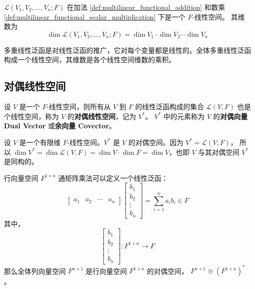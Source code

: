 \begin{proposition}[全体多重线性泛函构成一个线性空间]
    $\mathcal{L}(V_1,V_2,\ldots,V_n;F)$ 在加法 \ref{def:multilinear_functional_addition} 和数乘 \ref{def:multilinear_functional_scalar_multiplication} 下是一个 $F$-线性空间。
    其维数为
    \[
        \dim \mathcal{L}(V_1,V_2,\ldots,V_n;F) = \dim V_1 \cdot \dim V_2 \cdots \dim V_n
    \]
\end{proposition}

\begin{note}
    多重线性泛函是对线性泛函的推广，它对每个变量都是线性的。全体多重线性泛函构成一个线性空间，其维数是各个线性空间维数的乘积。
\end{note}


\vspace{1em}
\subsection{对偶线性空间}

\begin{definition}
    设 $V$ 是一个 $F$-线性空间，则所有从 $V$ 到 $F$ 的线性泛函构成的集合 $\mathcal{L}(V,F)$ 也是个线性空间，称为 $V$ 的\textbf{对偶线性空间}，记为 $V^*$。
    $V^*$ 中的元素称为 $V$ 的\textbf{对偶向量 Dual Vector} 或\textbf{余向量 Covector}。 
    \label{def:dual_linear_space}
\end{definition}

\begin{proposition}[线性空间与其对偶空间是自然同构的]
    设 $V$ 是一个有限维 $F$-线性空间。$V^*$ 是 $V$ 的对偶空间。因为 $V^* = \mathcal{L}(V,F)$，
    所以 $\dim V^* = \dim \mathcal{L}(V,F) = \dim V \cdot \dim F = \dim V$，也即 $V$ 与其对偶空间 $V^*$ 是同构的。
\end{proposition}

\begin{example}
    行向量空间 $F^{1\times n}$ 通矩阵乘法可以定义一个线性泛函：
    \[
        \begin{bmatrix}
            a_1 & a_2 & \cdots & a_n
        \end{bmatrix}\begin{bmatrix}
            b_1 \\ b_2 \\ \vdots \\ b_n
        \end{bmatrix} = \sum_{i=1}^{n} a_i b_i \in F
    \]
    其中，
    \[
        \begin{bmatrix}
            b_1 \\ b_2 \\ \vdots \\ b_n
        \end{bmatrix} : F^{1\times n} \to F
    \]
    那么全体列向量空间 $F^{n\times 1}$ 是行向量空间 $F^{1\times n}$ 的对偶空间， $F^{n\times 1} \cong (F^{1\times n})^*$。
\end{example}

